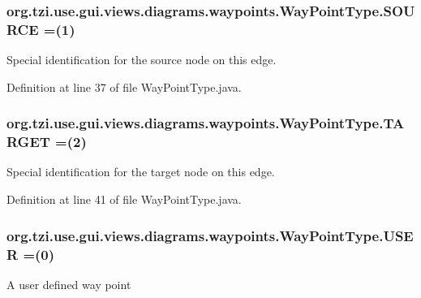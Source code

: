 \hypertarget{enumorg_1_1tzi_1_1use_1_1gui_1_1views_1_1diagrams_1_1waypoints_1_1_way_point_type_ae483c4554f29bcd78f34d74a45ec807b}{
\subsubsection[{S\-O\-U\-R\-C\-E}]{\setlength{\rightskip}{0pt plus 5cm}org.\-tzi.\-use.\-gui.\-views.\-diagrams.\-waypoints.\-Way\-Point\-Type.\-S\-O\-U\-R\-C\-E =(1)}}\label{enumorg_1_1tzi_1_1use_1_1gui_1_1views_1_1diagrams_1_1waypoints_1_1_way_point_type_ae483c4554f29bcd78f34d74a45ec807b}
Special identification for the source node on this edge. 

Definition at line 37 of file Way\-Point\-Type.\-java.

\hypertarget{enumorg_1_1tzi_1_1use_1_1gui_1_1views_1_1diagrams_1_1waypoints_1_1_way_point_type_aee2e747e54fba3ecfc5f597b7a3a52fb}{
\subsubsection[{T\-A\-R\-G\-E\-T}]{\setlength{\rightskip}{0pt plus 5cm}org.\-tzi.\-use.\-gui.\-views.\-diagrams.\-waypoints.\-Way\-Point\-Type.\-T\-A\-R\-G\-E\-T =(2)}}\label{enumorg_1_1tzi_1_1use_1_1gui_1_1views_1_1diagrams_1_1waypoints_1_1_way_point_type_aee2e747e54fba3ecfc5f597b7a3a52fb}
Special identification for the target node on this edge. 

Definition at line 41 of file Way\-Point\-Type.\-java.

\hypertarget{enumorg_1_1tzi_1_1use_1_1gui_1_1views_1_1diagrams_1_1waypoints_1_1_way_point_type_ae023420db76a7b290c2c82b0c784ffd1}{
\subsubsection[{U\-S\-E\-R}]{\setlength{\rightskip}{0pt plus 5cm}org.\-tzi.\-use.\-gui.\-views.\-diagrams.\-waypoints.\-Way\-Point\-Type.\-U\-S\-E\-R =(0)}}\label{enumorg_1_1tzi_1_1use_1_1gui_1_1views_1_1diagrams_1_1waypoints_1_1_way_point_type_ae023420db76a7b290c2c82b0c784ffd1}
A user defined way point 

